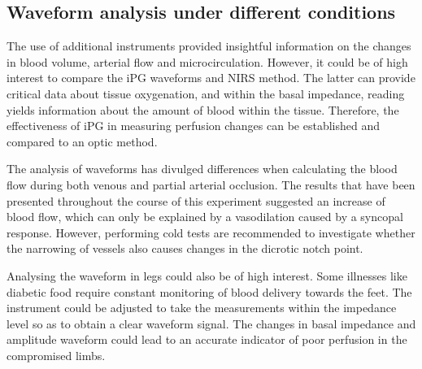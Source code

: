 \subsection{Waveform analysis under different conditions}
The use of additional instruments provided insightful information on the changes in blood volume, arterial flow and microcirculation. However, it could be of high interest to compare the iPG waveforms and NIRS method. The latter can provide critical data about tissue oxygenation, and within the basal impedance, reading yields information about the amount of blood within the tissue. Therefore, the effectiveness of iPG in measuring perfusion changes can be established and compared to an optic method.

The analysis of waveforms has divulged differences when calculating the blood flow during both venous and partial arterial occlusion. The results that have been presented throughout the course of this experiment suggested an increase of  blood flow, which can only be explained by a vasodilation caused by a syncopal response. However, performing cold tests are recommended to investigate whether the narrowing of vessels also causes changes in the dicrotic notch point.

Analysing the waveform in  legs could also be of high interest. Some illnesses like diabetic food require constant monitoring of blood delivery towards the feet. The instrument could be adjusted to take the measurements within the impedance level so as to obtain a clear waveform signal. The changes in basal impedance and amplitude waveform could lead to an accurate indicator of poor perfusion in the compromised limbs.


